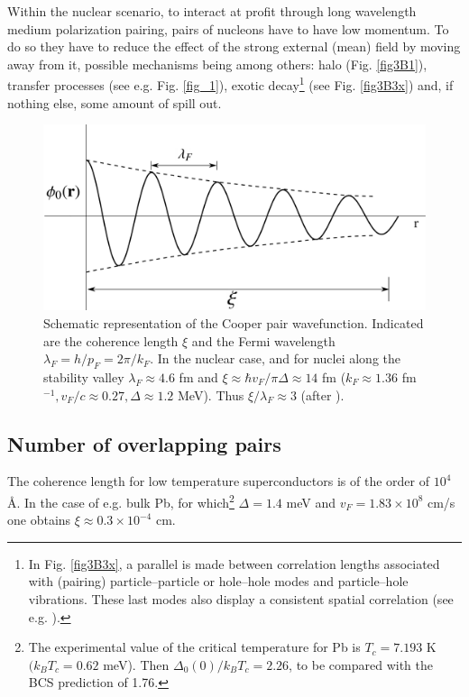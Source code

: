 \begin{subappendices}
     
     Within the nuclear scenario, to interact at profit through long wavelength medium polarization pairing, pairs of nucleons have to have low momentum. To do so they have to reduce the effect of the strong external (mean) field by moving away from it, possible mechanisms being among others: halo (Fig. \ref{fig3B1}), transfer processes (see e.g. Fig. \ref{fig_1}), exotic decay\footnote{In Fig. \ref{fig3B3x}, a parallel is made between correlation lengths associated with (pairing) particle--particle or hole--hole modes and particle--hole vibrations. These last modes  also display a consistent spatial correlation (see e.g. \cite{Broglia:71}).} (see Fig. \ref{fig3B3x}) and, if nothing else, some amount of spill out.    

 \begin{figure}[h]
 	\centerline{\includegraphics*[width=12cm,angle=0	]{nutshell/figs/fig3B2}}
 	\caption{Schematic representation of the Cooper pair wavefunction. Indicated are the coherence length $\xi$ and the Fermi wavelength $\lambda_F=h/p_F=2\pi/k_F$. In the nuclear case, and for nuclei along the stability valley $\lambda_F\approx4.6$ fm and $\xi\approx \hbar v_F/\pi\Delta\approx14$ fm ($k_F\approx 1.36$ fm $^{-1}, v_F/c\approx0.27, \Delta\approx 1.2$ MeV). Thus $\xi/\lambda_F\approx 3$ (after \cite{Weisskopf:81}).}\label{fig3B2}
 \end{figure}
 





\subsection{Number of overlapping pairs}
 

The coherence length for low temperature superconductors is of the order of $10^4$\AA. In the case of e.g. bulk Pb, for which\footnote{\label{foot75}  The experimental value of the critical temperature for Pb is $T_c=7.193$ K $(k_BT_c=0.62$ meV).  Then  $\Delta_0(0)/k_BT_c=2.26$, to be compared with the BCS prediction of 1.76. } $\Delta=1.4$ meV and $v_F=1.83\times10^8$ cm/s one obtains $\xi\approx0.3\times10^{-4}$ cm. 


\end{subappendices}
